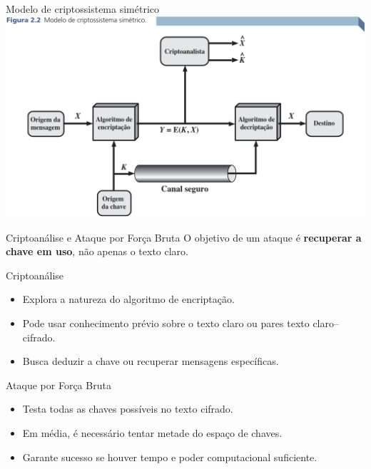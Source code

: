 \begin{frame}{Modelo de criptossistema simétrico}
    \centering
    \includegraphics[width=0.9\linewidth]{Figuras/modelo-cripto-simetrico-2.png}


\end{frame}

\begin{frame}{Criptoanálise e Ataque por Força Bruta}
O objetivo de um ataque é \textbf{recuperar a chave em uso}, não apenas o texto claro.

\begin{block}{Criptoanálise}
\begin{itemize}
    \item Explora a natureza do algoritmo de encriptação.  
    \item Pode usar conhecimento prévio sobre o texto claro ou pares texto claro–cifrado.  
    \item Busca deduzir a chave ou recuperar mensagens específicas.  
\end{itemize}
\end{block}

\begin{block}{Ataque por Força Bruta}
\begin{itemize}
    \item Testa todas as chaves possíveis no texto cifrado.  
    \item Em média, é necessário tentar metade do espaço de chaves.  
    \item Garante sucesso se houver tempo e poder computacional suficiente.  
\end{itemize}
\end{block}
\end{frame}

